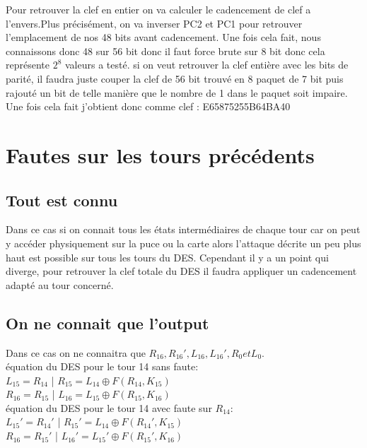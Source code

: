 \documentclass[a4paper,10pt]{report}
\begin{document}
			\newpage
			Pour retrouver la clef en entier on va calculer le cadencement de clef a l'envers.Plus précisément, on va inverser PC2 et PC1 pour retrouver l'emplacement de nos 48 bits avant cadencement. Une fois cela fait, nous connaissons donc 48 sur 56 bit donc il faut force brute sur 8 bit donc cela représente $2^{8}$ valeurs a testé. si on veut retrouver la clef entière avec les bits de parité, il faudra juste couper la clef de 56 bit trouvé en 8 paquet de 7 bit puis rajouté un bit de telle manière que le nombre de 1 dans le paquet soit impaire.\\
			Une fois cela fait j'obtient donc comme clef : E65875255B64BA40
		
		\chapter{Fautes sur les tours précédents}
			\section{Tout est connu}
			Dans ce cas si on connait tous les états intermédiaires de chaque tour car on peut y accéder physiquement sur la puce ou la carte alors l'attaque décrite un peu plus haut est possible sur tous les tours du DES. Cependant il y a un point qui diverge, pour retrouver la clef totale du DES il faudra appliquer un cadencement adapté au tour concerné.
			
			\section{On ne connait que l'output}
			Dans ce cas on ne connaitra que $R_{16},R_{16}',L_{16},L_{16}',R_{0} et L_{0}$.\\
			équation du DES pour le tour 14 sans faute:\\
			$L_{15}=R_{14}$ | $R_{15}=L_{14}\oplus F(R_{14},K_{15})$\\
			$R_{16}=R_{15}$ | $L_{16}=L_{15}\oplus F(R_{15},K_{16})$\\
			équation du DES pour le tour 14 avec faute sur $R_{14}$:\\
			$L_{15}'=R_{14}'$ | $R_{15}'=L_{14}\oplus F(R_{14}',K_{15})$\\
			$R_{16}=R_{15}'$ | $L_{16}'=L_{15}'\oplus F(R_{15}',K_{16})$\\
			
\end{document}
